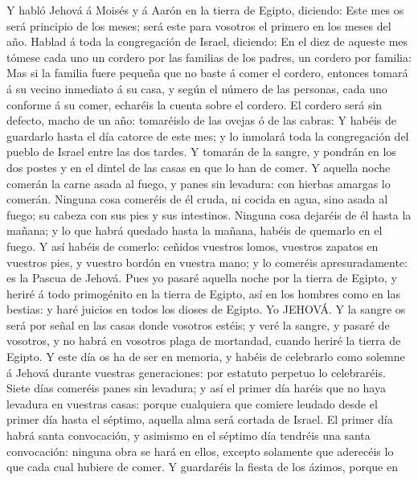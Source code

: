  Y habló Jehová á Moisés y á Aarón en la tierra de Egipto,
diciendo:  Este mes os será principio de los meses; será
este para vosotros el primero en los meses del año. 
Hablad á toda la congregación de Israel, diciendo: En el diez de aqueste
mes tómese cada uno un cordero por las familias de los padres, un
cordero por familia:  Mas si la familia fuere pequeña que
no baste á comer el cordero, entonces tomará á su vecino inmediato á su
casa, y según el número de las personas, cada uno conforme á su comer,
echaréis la cuenta sobre el cordero.  El cordero será sin
defecto, macho de un año: tomaréislo de las ovejas ó de las cabras:
 Y habéis de guardarlo hasta el día catorce de este mes; y
lo inmolará toda la congregación del pueblo de Israel entre las dos
tardes.  Y tomarán de la sangre, y pondrán en los dos
postes y en el dintel de las casas en que lo han de comer.
 Y aquella noche comerán la carne asada al fuego, y panes
sin levadura: con hierbas amargas lo comerán.  Ninguna
cosa comeréis de él cruda, ni cocida en agua, sino asada al fuego; su
cabeza con sus pies y sus intestinos.  Ninguna cosa
dejaréis de él hasta la mañana; y lo que habrá quedado hasta la mañana,
habéis de quemarlo en el fuego.  Y así habéis de comerlo:
ceñidos vuestros lomos, vuestros zapatos en vuestros pies, y vuestro
bordón en vuestra mano; y lo comeréis apresuradamente: es la Pascua de
Jehová.  Pues yo pasaré aquella noche por la tierra de
Egipto, y heriré á todo primogénito en la tierra de Egipto, así en los
hombres como en las bestias: y haré juicios en todos los dioses de
Egipto. Yo JEHOVÁ.  Y la sangre os será por señal en las
casas donde vosotros estéis; y veré la sangre, y pasaré de vosotros, y
no habrá en vosotros plaga de mortandad, cuando heriré la tierra de
Egipto.  Y este día os ha de ser en memoria, y habéis de
celebrarlo como solemne á Jehová durante vuestras generaciones: por
estatuto perpetuo lo celebraréis.  Siete días comeréis
panes sin levadura; y así el primer día haréis que no haya levadura en
vuestras casas: porque cualquiera que comiere leudado desde el primer
día hasta el séptimo, aquella alma será cortada de Israel.
 El primer día habrá santa convocación, y asimismo en el
séptimo día tendréis una santa convocación: ninguna obra se hará en
ellos, excepto solamente que aderecéis lo que cada cual hubiere de
comer.  Y guardaréis la fiesta de los ázimos, porque en
